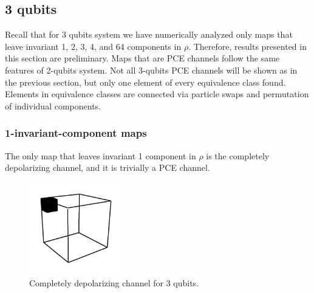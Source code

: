 \documentclass[11pt,dvipsnames]{article} %
\newcommand{\1}{\mathds{1}}
\begin{document}
\subsection*{3 qubits} %

Recall that for 3 qubits system we have numerically analyzed only maps that
leave invariant 1, 2, 3, 4, and 64 components in $\rho$. Therefore, results
presented in this section are preliminary. Maps that are PCE channels follow the same
features of 2-qubits system. Not all 3-qubits PCE channels 
will be shown as in
the previous section, but only one element of every equivalence class found.
Elements in equivalence classes are connected via particle swaps and
permutation of individual components.

\subsubsection*{1-invariant-component maps} %
The only map that leaves invariant 1 component in $\rho$ is the completely
depolarizing channel, and it is trivially a PCE channel.
\begin{figure}[H]
	\includegraphics[height=4cm]{img/3q-1c}
	\caption{Completely depolarizing channel for 3 qubits.}
	\label{fig:QC-3q-1c}
\end{figure}
\end{document}

